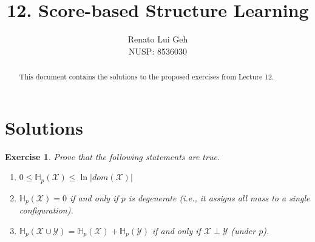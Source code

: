 \documentclass{amsart}
\title[]{12. Score-based Structure Learning}
\author[]{Renato Lui Geh\\NUSP\@: 8536030}
\theoremstyle{plain}
\newtheorem{exercise}{Exercise}
\newcommand{\set}[1]{\mathcal{#1}}
\newcommand{\entropy}{\mathbb{H}_p}
\begin{document}
\begin{abstract}
  This document contains the solutions to the proposed exercises from Lecture 12.
  \vspace*{-2.5em}
\end{abstract}

\maketitle

\section{Solutions}

\begin{exercise}
  Prove that the following statements are true.
  \begin{enumerate}[label=(\roman*)]
    \item $0\leq \entropy(\set{X})\leq \ln |dom(\set{X})|$
    \item $\entropy(\set{X})=0$ if and only if $p$ is degenerate (i.e., it assigns all mass to a
      single configuration).
    \item $\entropy(\set{X}\cup\set{Y})=\entropy(\set{X})+\entropy(\set{Y})$ if and only if
      $\set{X}\perp\set{Y}$ (under $p$).
  \end{enumerate}
\end{exercise}
\end{document}
